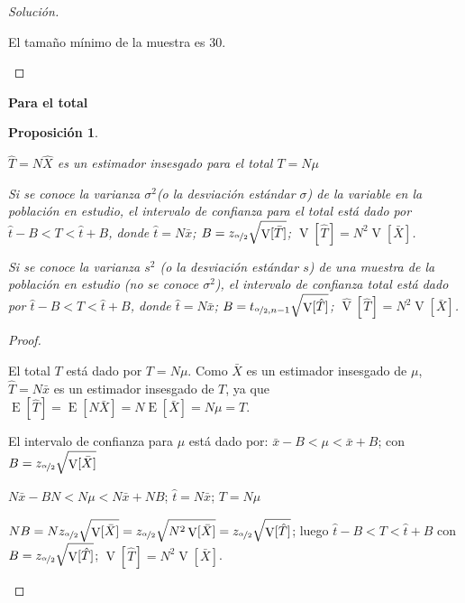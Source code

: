 \documentclass[a5paper,doc,10pt,noapacite]{apa6}
\DeclareMathOperator{\Esp}{E}
\DeclareMathOperator{\Var}{V}
\newtheorem{proposicion}{Proposición}
\newcommand{\neodefi}[1]{%
	\vspace{1\baselineskip}
	\textbf{\small#1} \newline
}
\begin{document}
{{\begin{proof}[Solución]
\begin{APAenumerate}
	
	El tamaño mínimo de la muestra es \(30\).				\qedhere
	\end{APAenumerate}
\end{proof}


\newpage

\neodefi{Para el total}

\begin{proposicion}\label{prop-5.6}\quad
	\begin{APAenumerate}
		\item \(\hat{T}=N\hat{X}\) es un estimador insesgado para el total \(T=N\mu\)
		\item Si se conoce la varianza \(\sigma^2\)(o la desviación estándar \(\sigma\)) de la variable en la población en estudio, el intervalo de confianza para el total está dado por \(\hat{t}-B<T<\hat{t}+B\), donde \(\hat{t}=N\bar{x}\); \(B=z_{\nicefrac{\alpha}{2}}\sqrt{\Var[\bar{T}]}\); \(\Var[\hat{T}]=N^2\Var[\bar{X}]\).
		\item Si se conoce la varianza \(s^2\) (o la desviación estándar \(s\)) de una muestra de la población en estudio (no se conoce \(\sigma^2\)), el intervalo de confianza total está dado por \(\hat{t}-B<T<\hat{t}+B\), donde \(\hat{t}=N\bar{x}\); \(B=t_{\nicefrac{\alpha}{2},n-1}\sqrt{\Var[\hat{T}]}\); \(\hat{\Var}[\hat{T}]=N^2\Var[\bar{X}]\).
	\end{APAenumerate}
\end{proposicion}
\begin{proof}\quad
	\begin{APAenumerate}
		\item El total \(T\) está dado por \(T=N\mu\). Como \(\bar{X}\) es un estimador insesgado de \(\mu\), \(\hat{T}=N\bar{x}\) es un estimador insesgado de \(T\), ya que \(\Esp[\hat{T}]=\Esp[N\bar{X}]=N\Esp[\bar{X}]=N\mu=T\).
		
		\vspace{1\baselineskip}
		\item El intervalo de confianza para \(\mu\) está dado por: \(\bar{x}-B<\mu<\bar{x}+B\); con \(B=z_{\nicefrac{\alpha}{2}}\sqrt{\Var[\bar{X}]}\)
		
		\(N\bar{x}-BN<N\mu<N\bar{x}+NB\); \(\hat{t}=N\bar{x}\); \(T=N\mu\)
		
		\(NB=Nz_{\nicefrac{\alpha}{2}}\sqrt{\Var[\bar{X}]}=z_{\nicefrac{\alpha}{2}}\sqrt{N^2\Var[\bar{X}]}=z_{\nicefrac{\alpha}{2}}\sqrt{\Var[\hat{T}]}\); luego \(\hat{t}-B<T<\hat{t}+B\) con \(B=z_{\nicefrac{\alpha}{2}}\sqrt{\Var[\hat{T}]}\); \(\Var[\hat{T}]=N^2\Var[\bar{X}]\).
		

\end{APAenumerate}
\end{proof}}}
\end{document}
